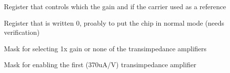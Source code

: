 \documentclass[letterpaper,10pt,english]{sphinxmanual}
\begin{document}
\begin{fulllineitems}
\begin{fulllineitems}
\end{fulllineitems}


\begin{fulllineitems}
\label{\detokenize{index:TiePieLCR.TiePieLCR.I2C_LEDOUT1}}
\sphinxAtStartPar
Register that controls which the gain and if the carrier used as a reference

\end{fulllineitems}


\begin{fulllineitems}
\label{\detokenize{index:TiePieLCR.TiePieLCR.I2C_MODE1}}
\sphinxAtStartPar
Register that is written 0, proably to put the chip in normal mode (needs verification)

\end{fulllineitems}


\begin{fulllineitems}
\label{\detokenize{index:TiePieLCR.TiePieLCR.I2C_NONE}}
\sphinxAtStartPar
Mask for selecting 1x gain or none of the transimpedance amplifiers

\end{fulllineitems}


\begin{fulllineitems}
\label{\detokenize{index:TiePieLCR.TiePieLCR.I2C_RANGE1}}
\sphinxAtStartPar
Mask for enabling the first (370uA/V) transimpedance amplifier


\end{fulllineitems}
\end{fulllineitems}
\end{document}
